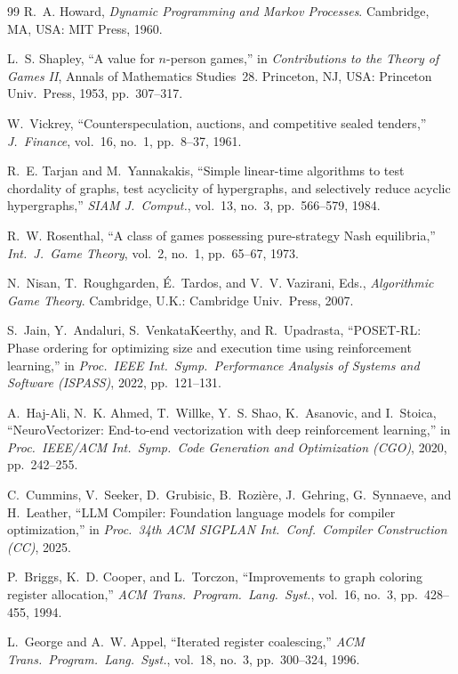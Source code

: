 \documentclass{ieeeaccess}
\begin{document}
\begin{thebibliography}{99}
R.~A. Howard, \emph{Dynamic Programming and Markov Processes}.
Cambridge, MA, USA: MIT Press, 1960.

L.~S. Shapley, ``A value for $n$-person games,'' in \emph{Contributions
to the Theory of Games II}, Annals of Mathematics Studies~28.
Princeton, NJ, USA: Princeton Univ.\ Press, 1953, pp.~307--317.

W.~Vickrey, ``Counterspeculation, auctions, and competitive sealed
tenders,'' \emph{J.~Finance}, vol.~16, no.~1, pp.~8--37, 1961.

R.~E. Tarjan and M.~Yannakakis, ``Simple linear-time algorithms to test
chordality of graphs, test acyclicity of hypergraphs, and selectively
reduce acyclic hypergraphs,'' \emph{SIAM J.\ Comput.}, vol.~13, no.~3,
pp.~566--579, 1984.

R.~W. Rosenthal, ``A class of games possessing pure-strategy Nash
equilibria,'' \emph{Int.\ J.\ Game Theory}, vol.~2, no.~1, pp.~65--67,
1973.

N.~Nisan, T.~Roughgarden, {\'E}.~Tardos, and V.~V. Vazirani, Eds.,
\emph{Algorithmic Game Theory}. Cambridge, U.K.: Cambridge Univ.\
Press, 2007.

S.~Jain, Y.~Andaluri, S.~VenkataKeerthy, and R.~Upadrasta, ``POSET-RL:
Phase ordering for optimizing size and execution time using
reinforcement learning,'' in \emph{Proc.\ IEEE Int.\ Symp.\ Performance
Analysis of Systems and Software (ISPASS)}, 2022, pp.~121--131.

A.~Haj-Ali, N.~K. Ahmed, T.~Willke, Y.~S. Shao, K.~Asanovic, and
I.~Stoica, ``NeuroVectorizer: End-to-end vectorization with deep
reinforcement learning,'' in \emph{Proc.\ IEEE/ACM Int.\ Symp.\ Code
Generation and Optimization (CGO)}, 2020, pp.~242--255.

C.~Cummins, V.~Seeker, D.~Grubisic, B.~Rozi{\`e}re, J.~Gehring,
G.~Synnaeve, and H.~Leather, ``LLM Compiler: Foundation language models
for compiler optimization,'' in \emph{Proc.\ 34th ACM SIGPLAN Int.\
Conf.\ Compiler Construction (CC)}, 2025.

P.~Briggs, K.~D. Cooper, and L.~Torczon, ``Improvements to graph
coloring register allocation,'' \emph{ACM Trans.\ Program.\ Lang.\
Syst.}, vol.~16, no.~3, pp.~428--455, 1994.

\bibitem{george1996}
L.~George and A.~W. Appel, ``Iterated register coalescing,'' \emph{ACM
Trans.\ Program.\ Lang.\ Syst.}, vol.~18, no.~3, pp.~300--324, 1996.


\end{thebibliography}
\end{document}
